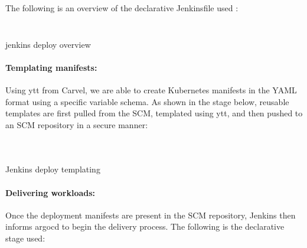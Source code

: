 The following is an overview of the declarative Jenkinsfile used : 

 
\begin{listing}[H]
    \inputminted[firstline=1,lastline=30]{Dockerfile}{codeListing/Jenkinsfile_deploy_overview}
\end{listing}
 
\begin{listing}[H]
    \inputminted[firstline=31]{Dockerfile}{codeListing/Jenkinsfile_deploy_overview}
    \caption{jenkins deploy overview}
    \label{lst:jenkinsfile_deploy_overview}
\end{listing}

\paragraph{Templating manifests: }

Using ytt from Carvel, we are able to create Kubernetes manifests in the YAML format using a specific variable schema. As shown in the stage below, reusable templates are first pulled from the SCM, templated using ytt, and then pushed to an SCM repository in a secure manner: 

 \begin{listing}[H]
    \inputminted[firstline=1,lastline=15]{Dockerfile}{codeListing/Jenkinsfile_deploy_templating}
\end{listing}

 \begin{listing}[H]
    \inputminted[firstline=16,lastline=49]{Dockerfile}{codeListing/Jenkinsfile_deploy_templating}
\end{listing}

 \begin{listing}[H]
    \inputminted[firstline=50]{Dockerfile}{codeListing/Jenkinsfile_deploy_templating}
    \caption{Jenkins deploy templating}
    \label{lst:jenkinsfile_deploy_templating}
\end{listing}


 
\paragraph{Delivering workloads: }

Once the deployment manifests are present in the SCM repository, Jenkins then informs argocd to begin the delivery process. The following is the declarative stage used: 

\begin{listing}[H]
    \inputminted[firstline=1,lastline=10]{Dockerfile}{codeListing/Jenkinsfile_deploy_delivery}
\end{listing}

